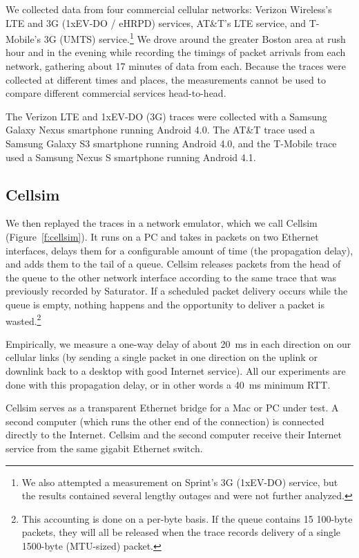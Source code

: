 We collected data from four commercial cellular networks: Verizon
Wireless's LTE and 3G (1xEV-DO / eHRPD) services, AT\&T's LTE service,
and T-Mobile's 3G (UMTS) service.\footnote{We also attempted a
  measurement on Sprint's 3G (1xEV-DO) service, but the results
  contained several lengthy outages and were not further analyzed.} We
drove around the greater Boston area at rush hour and in the evening
while recording the timings of packet arrivals from each network,
gathering about 17 minutes of data from each. Because the traces were
collected at different times and places, the measurements cannot be
used to compare different commercial services head-to-head.

The Verizon LTE and 1xEV-DO (3G) traces
were collected with a Samsung Galaxy Nexus smartphone running Android 4.0. The AT\&T
trace used a Samsung Galaxy S3 smartphone running Android 4.0, and the
T-Mobile trace used a Samsung Nexus S smartphone running Android 4.1.

\subsection{Cellsim}

We then replayed the traces in a network emulator, which we call
Cellsim (Figure~\ref{f:cellsim}). It runs on a PC and takes in packets
on two Ethernet interfaces, delays them for a configurable amount of
time (the propagation delay), and adds them to the tail of a
queue. Cellsim releases packets from the head of the queue to the
other network interface according to the same trace that was
previously recorded by Saturator. If a scheduled packet delivery
occurs while the queue is empty, nothing happens and the opportunity
to deliver a packet is wasted.\footnote{This accounting is done on a
  per-byte basis. If the queue contains 15 100-byte packets, they will
  all be released when the trace records delivery of a single
  1500-byte (MTU-sized) packet.}

Empirically, we measure a one-way delay of about 20~ms in each
direction on our cellular links (by sending a single packet in one
direction on the uplink or downlink back to a desktop with good
Internet service). All our experiments are done with this
propagation delay, or in other words a 40~ms minimum RTT.

Cellsim serves as a transparent Ethernet bridge for a Mac or PC under
test. A second computer (which runs the other end of the connection)
is connected directly to the Internet. Cellsim and the second computer
receive their Internet service from the same gigabit Ethernet switch.

